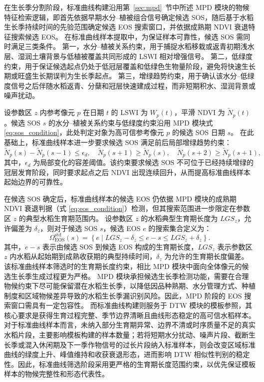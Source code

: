 在生长季分割阶段，标准曲线构建沿用第~\ref{sec:mpd}~节中所述 MPD 模块的物候特征检索逻辑，即首先依据早期水分--植被组合信号确定候选 SOS，随后基于水稻生长季持续时间的先验范围确定候选 EOS 搜索窗口，并依据成熟期 NDVI 衰退特征搜索候选 EOS。
在标准曲线样本提取中，为保证样本可靠性，候选 SOS 需同时满足三类条件。
第一，水分--植被关系约束，用于捕捉水稻移栽或返青初期浅水层、湿润土壤背景与低植被覆盖共同形成的 LSWI 相对增强信号。
第二，低绿度约束，用于保证候选起点仍处于低冠层覆盖和低绿色生物量阶段，避免将快速生长期或旺盛生长期误判为生长季起点。
第三，增绿趋势约束，用于确认该水分--低绿度信号之后伴随水稻返青、分蘖和冠层快速建成过程，而非短期积水、湿润背景或噪声扰动。

设参数区 \(z\) 内参考像元 \(p\) 在日期 \(t\) 的 LSWI 为 \(W_p(t)\)，平滑 NDVI 为 \(\widetilde{N}_p(t)\)。候选 SOS \(s\) 的水分--植被关系约束与低绿度约束沿用 MPD 模块式 \ref{eq:sos_condition}，此处判定对象为高可信参考像元 \(p\) 的候选 SOS 日期 \(s\)。
在此基础上，标准曲线样本进一步要求候选 SOS 满足前后局部增绿趋势约束：
\begin{equation}
    \widetilde{N}_p(s)-\widetilde{N}_p(s-1)\leq \epsilon_d,
    \quad
    \widetilde{N}_p(s+1)\geq \widetilde{N}_p(s),
    \quad
    \widetilde{N}_p(s+2)\geq \widetilde{N}_p(s+1),
    \label{eq:std_sos_trend}
\end{equation}
其中，\(\epsilon_d\) 为局部变化的容差阈值。该约束要求候选 SOS 不可位于已经持续增绿的冠层发育阶段，同时要求起点之后 NDVI 出现连续回升，从而提高标准曲线样本起始边界的可靠性。

在候选 SOS 确定后，标准曲线样本的候选 EOS 仍依据 MPD 模块的成熟期 NDVI 衰退判据（式 \ref{eq:eos_condition}）检测，但其搜索范围进一步限定在参数区 \(z\) 的典型水稻生育期范围内。
设参数区 \(z\) 的水稻典型生育期长度为 \(LGS_z\)，允许偏差为 \(\delta_z\)，则对于候选 SOS \(s\)，候选 EOS \(e\) 的搜索集合定义为：
\begin{equation}
    \Omega^{\mathrm{std}}_{\mathrm{EOS}}(s)=
    \left\{
    e \mid LGS_z-\delta_z \leq e-s \leq LGS_z+\delta_z
    \right\}.
    \label{eq:std_eos_window}
\end{equation}
其中，\(e-s\) 表示由候选 SOS 到候选 EOS 构成的生育期长度，\(LGS_z\) 表示参数区 \(z\) 内水稻从起始期到成熟收获期的典型持续时间，\(\delta_z\) 为允许的生育期长度偏差。
该标准曲线样本筛选时的生育期长度约束，相比 MPD 模块中面向全体像元的候选生长季生成过程更为严格。
MPD 模块承担候选生长季检测功能，需要在合理物候约束下尽可能保留潜在水稻生长季，以降低因品种熟期、水分管理方式、种植制度和区域物候差异导致的水稻生长季漏识别风险。因此，MPD 阶段的 EOS 搜索窗口需具有一定包容性。
而标准曲线构建则服务于 DTW 模块的模板参照，其核心要求是获得生育过程完整、季节边界清晰且曲线形态稳定的高可信水稻样本。对于标准曲线样本而言，未纳入部分生育期异常、边界不清或时序质量不足的真实水稻片段，主要影响模板构建的样本数量；若将短期水分扰动、噪声片段、截断生长季或混入休闲期及下一季作物信号的过长片段纳入标准样本，则会改变区域标准曲线的绿度上升、峰值维持和收获衰退形态，进而影响 DTW 相似性判别的稳定性。因此，标准曲线筛选阶段采用更严格的生育期长度范围约束，以优先保证模板样本的物候完整性和形态代表性。

